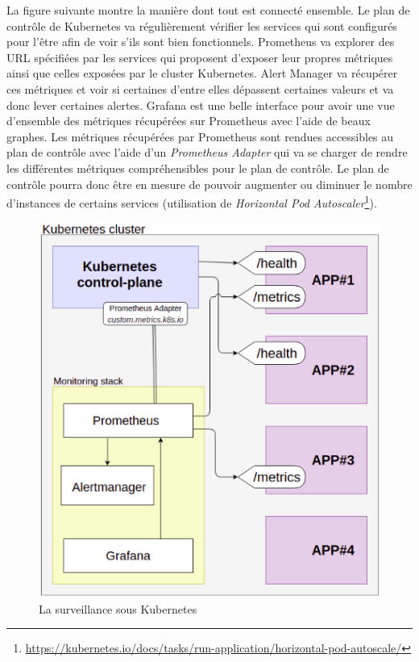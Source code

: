 La figure suivante montre la manière dont tout est connecté ensemble. Le
plan de contrôle de Kubernetes va régulièrement vérifier les services
qui sont configurés pour l'être afin de voir s'ils sont bien
fonctionnels. Prometheus va explorer des URL spécifiées par les services
qui proposent d'exposer leur propres métriques ainsi que celles exposées
par le cluster Kubernetes. Alert Manager va récupérer ces métriques et
voir si certaines d'entre elles dépassent certaines valeurs et va donc
lever certaines alertes. Grafana est une belle interface pour avoir une
vue d'ensemble des métriques récupérées sur Prometheus avec l'aide de
beaux graphes. Les métriques récupérées par Prometheus sont rendues
accessibles au plan de contrôle avec l'aide d'un \textit{Prometheus
Adapter} qui va se charger de rendre les différentes métriques
compréhensibles pour le plan de contrôle. Le plan de contrôle pourra
donc être en mesure de pouvoir augmenter ou diminuer le nombre
d'instances de certains services (utilisation de \textit{Horizontal Pod
Autoscaler}\footnote{
  \url{https://kubernetes.io/docs/tasks/run-application/horizontal-pod-autoscale/}}).

\begin{figure}[h]
  \caption{\label{monitor} La surveillance sous Kubernetes}
  \includegraphics[width=15cm]{images/monitoring}
\end{figure}

